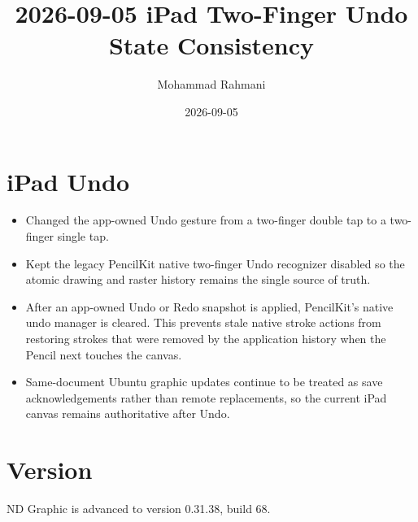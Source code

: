 \documentclass[a4paper]{article}
\title{2026-09-05 iPad Two-Finger Undo State Consistency}
\date{2026-09-05}
\author{Mohammad Rahmani}
\begin{document}
   \maketitle

   \section{iPad Undo}
   \begin{itemize}
      \item Changed the app-owned Undo gesture from a two-finger double tap to a two-finger single tap.
      \item Kept the legacy PencilKit native two-finger Undo recognizer disabled so the atomic drawing and raster history remains the single source of truth.
      \item After an app-owned Undo or Redo snapshot is applied, PencilKit's native undo manager is cleared. This prevents stale native stroke actions from restoring strokes that were removed by the application history when the Pencil next touches the canvas.
      \item Same-document Ubuntu graphic updates continue to be treated as save acknowledgements rather than remote replacements, so the current iPad canvas remains authoritative after Undo.
   \end{itemize}

   \section{Version}
   ND Graphic is advanced to version 0.31.38, build 68.

   
   
\end{document}
